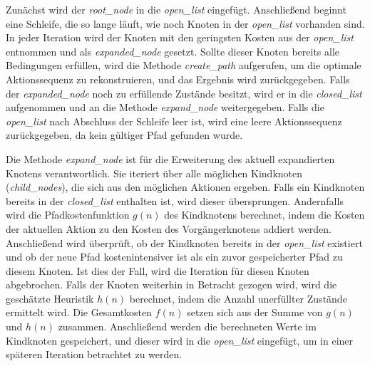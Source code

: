 Zunächst wird der \textit{root\_node} in die \textit{open\_list} eingefügt. Anschließend beginnt eine Schleife, die so lange läuft, wie noch Knoten in der \textit{open\_list} vorhanden sind. In jeder Iteration wird der Knoten mit den geringsten Kosten aus der \textit{open\_list} entnommen und als \textit{expanded\_node} gesetzt. Sollte dieser Knoten bereits alle Bedingungen erfüllen, wird die Methode \textit{create\_path} aufgerufen, um die optimale Aktionssequenz zu rekonstruieren, und das Ergebnis wird zurückgegeben. Falls der \textit{expanded\_node} noch zu erfüllende Zustände besitzt, wird er in die \textit{closed\_list} aufgenommen und an die Methode \textit{expand\_node} weitergegeben. Falls die \textit{open\_list} nach Abschluss der Schleife leer ist, wird eine leere Aktionssequenz zurückgegeben, da kein gültiger Pfad gefunden wurde.

Die Methode \textit{expand\_node} ist für die Erweiterung des aktuell expandierten Knotens verantwortlich. Sie iteriert über alle möglichen Kindknoten (\textit{child\_nodes}), die sich aus den möglichen Aktionen ergeben. Falls ein Kindknoten bereits in der \textit{closed\_list} enthalten ist, wird dieser übersprungen. Andernfalls wird die Pfadkostenfunktion $g(n)$ des Kindknotens berechnet, indem die Kosten der aktuellen Aktion zu den Kosten des Vorgängerknotens addiert werden. Anschließend wird überprüft, ob der Kindknoten bereits in der \textit{open\_list} existiert und ob der neue Pfad kostenintensiver ist als ein zuvor gespeicherter Pfad zu diesem Knoten. Ist dies der Fall, wird die Iteration für diesen Knoten abgebrochen. Falls der Knoten weiterhin in Betracht gezogen wird, wird die geschätzte Heuristik $h(n)$ berechnet, indem die Anzahl unerfüllter Zustände ermittelt wird. Die Gesamtkosten $f(n)$ setzen sich aus der Summe von $g(n)$ und $h(n)$ zusammen. Anschließend werden die berechneten Werte im Kindknoten gespeichert, und dieser wird in die \textit{open\_list} eingefügt, um in einer späteren Iteration betrachtet zu werden.

